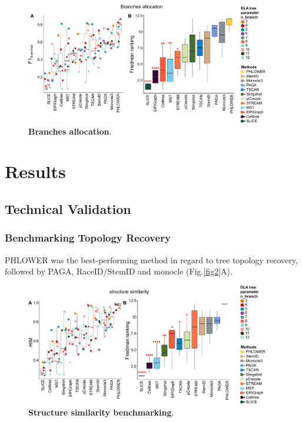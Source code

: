 \begin{figure}[!ht]
	\centering
	\includegraphics[width=0.95\textwidth]{F1branches/fig}
	\vspace{0.1cm}
	\caption[Branches allocation]{
	\textbf{Branches allocation}.}
	\label{fig:f1branches}
\end{figure}







\section{Results}
\subsection{Technical Validation}
\subsubsection{Benchmarking Topology Recovery}
PHLOWER was the best-performing method in regard to tree topology recovery, followed by PAGA, RaceID/StemID and monocle (Fig.\ref{fig2}A). 
\begin{figure}[!ht]
	\centering
	\includegraphics[width=0.95\textwidth]{HIM/fig}
	\vspace{0.1cm}
	\caption[Structure similarity benchmarking]{
	\textbf{Structure similarity benchmarking}.}
	\label{fig:HIM}
\end{figure}


